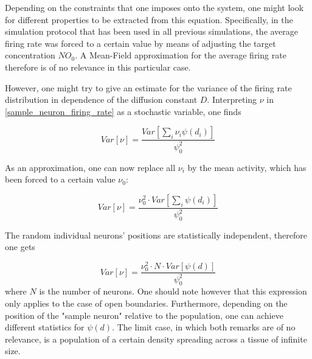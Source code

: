 \documentclass[10pt,a4paper]{article}
\begin{document}
Depending on the constraints that one imposes onto the system, one might look for different properties to be extracted from this equation. Specifically, in the simulation protocol that has been used in all previous simulations, the average firing rate was forced to a certain value by means of adjusting the target concentration $NO_0$. A Mean-Field approximation for the average firing rate therefore is of no relevance in this particular case.

However, one might try to give an estimate for the variance of the firing rate distribution in dependence of the diffusion constant $D$. Interpreting $\nu$ in \eqref{sample_neuron_firing_rate} as a stochastic variable, one finds

\begin{equation}
Var[\nu] = \frac{Var[\sum \limits_{i} \nu_i \psi(d_i)]}{\psi_0^2}
\label{variance_sample_neuron_firing_rate}
\end{equation}

As an approximation, one can now replace all $\nu_i$ by the mean activity, which has been forced to a certain value $\nu_0$:

\begin{equation}
Var[\nu] = \frac{\nu_0^2 \cdot Var[\sum \limits_{i} \psi(d_i)]}{\psi_0^2}
\label{variance_sample_neuron_firing_rate_mean_act}
\end{equation}

The random individual neurons' positions are statistically independent, therefore one gets

\begin{equation}
Var[\nu] = \frac{\nu_0^2 \cdot N \cdot Var[\psi(d)]}{\psi_0^2}
\label{variance_sample_neuron_firing_rate_mean_act_indep_positions}
\end{equation}
where $N$ is the number of neurons. One should note however that this expression only applies to the case of open boundaries. Furthermore, depending on the position of the "sample neuron" relative to the population, one can achieve different statistics for $\psi(d)$. The limit case, in which both remarks are of no relevance, is a population of a certain density spreading across a tissue of infinite size.




\end{document}
